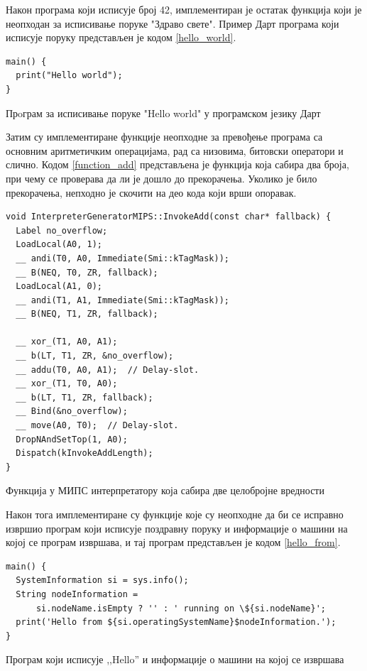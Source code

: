 \documentclass[12pt,oneside]{memoir}
\begin{document}
Након програма који исписује број 42, имплементиран је остатак функција који је неопходан за исписивање поруке "Здраво свете". Пример Дарт програма који исписује поруку представљен је кодом \ref{hello_world}.\\

\begin{listing}
\begin{verbatim}
main() {
  print("Hello world");
}
\end{verbatim}
\caption{Прoграм за исписивање поруке "Hello world" у програмском језику Дарт}
\label{hello_world}
\end{listing}

Затим су имплементиране функције неопходне за превођење програма са основним аритметичким операцијама, рад са низовима, битовски оператори и слично. Кодом \ref{function_add} представљена је функција која сабира два броја, при чему се проверава да ли је дошло до прекорачења. Уколико је било прекорачења, непходно је скочити на део кода који врши опоравак.\\

\begin{listing}
\begin{verbatim}
void InterpreterGeneratorMIPS::InvokeAdd(const char* fallback) {
  Label no_overflow;
  LoadLocal(A0, 1);
  __ andi(T0, A0, Immediate(Smi::kTagMask));
  __ B(NEQ, T0, ZR, fallback);
  LoadLocal(A1, 0);
  __ andi(T1, A1, Immediate(Smi::kTagMask));
  __ B(NEQ, T1, ZR, fallback);

  __ xor_(T1, A0, A1);
  __ b(LT, T1, ZR, &no_overflow);
  __ addu(T0, A0, A1);  // Delay-slot.
  __ xor_(T1, T0, A0);
  __ b(LT, T1, ZR, fallback);
  __ Bind(&no_overflow);
  __ move(A0, T0);  // Delay-slot.
  DropNAndSetTop(1, A0);
  Dispatch(kInvokeAddLength);
}
\end{verbatim}
\caption{Функција у МИПС интерпретатору која сабира две целобројне вредности}
\label{function_add}
\end{listing}

Након тога имплементиране су функције које су неопходне да би се исправно извршио програм који исписује поздравну поруку и информације о машини на којој се програм извршава, и тај програм представљен је кодом \ref{hello_from}.\\

\begin{listing}
\begin{verbatim}
main() {
  SystemInformation si = sys.info();
  String nodeInformation =
      si.nodeName.isEmpty ? '' : ' running on \${si.nodeName}';
  print('Hello from ${si.operatingSystemName}$nodeInformation.');
}
\end{verbatim}
\caption{Програм који исписује ,,Hello'' и информације о машини на којој се извршава }
\label{hello_from}
\end{listing}
\end{document}
